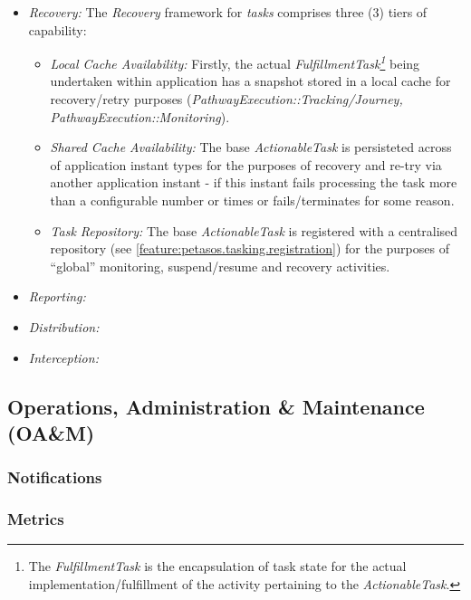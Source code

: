 \documentclass[a4paper]{book}
\begin{document}
\begin{itemize}
\begin{itemize}
            \item \textit{Recovery:} The \textit{Recovery} framework for \textit{tasks} comprises three (3) tiers of capability:
            \begin{itemize}
                \item \textit{Local Cache Availability:} Firstly, the actual \textit{FulfillmentTask\footnote{The \textit{FulfillmentTask} is the encapsulation of task state for the actual implementation/fulfillment of the activity pertaining to the \textit{ActionableTask}.}} being undertaken within application has a snapshot stored in a local cache for recovery/retry purposes (\textit{PathwayExecution::Tracking/Journey, PathwayExecution::Monitoring}).
                \item \textit{Shared Cache Availability:} The base \textit{ActionableTask} is persisteted across of application instant types for the purposes of recovery and re-try via another application instant - if this instant fails processing the task more than a configurable number or times or fails/terminates for some reason.
                \item \textit{Task Repository:} The base \textit{ActionableTask} is registered  with a centralised repository (see \ref{feature:petasos.tasking.registration}) for the purposes of ``global'' monitoring, suspend/resume and recovery activities.
            \end{itemize}
            \item \textit{Reporting:}
            \item \textit{Distribution:}
            \item \textit{Interception:}
        \end{itemize}
    \end{itemize}

\subsection{Operations, Administration \& Maintenance (OA\&M)}
\label{feature:petasos.oam}
\subsubsection{Notifications}
\label{feature:petasos.oam.notification}

\subsubsection{Metrics}
\label{feature:petasos.oam.metrics}
\end{document}
